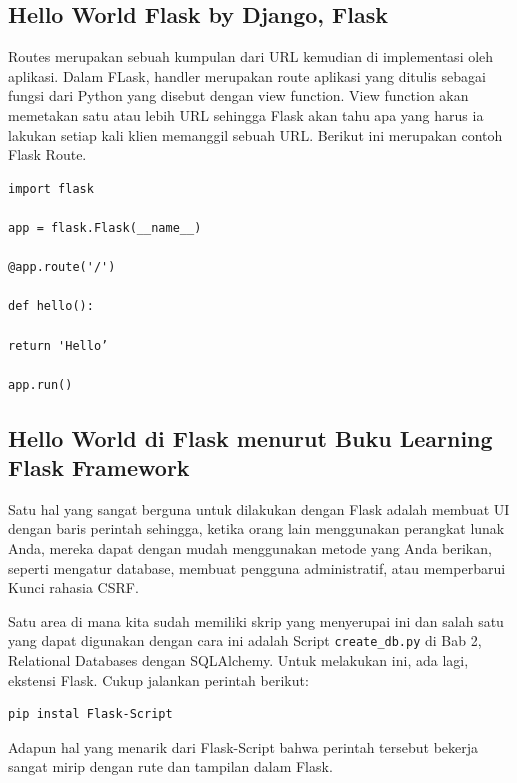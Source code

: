 \subsection{Hello World Flask by Django, Flask}
Routes merupakan sebuah kumpulan dari URL kemudian di implementasi oleh aplikasi. Dalam FLask, handler merupakan route aplikasi yang ditulis sebagai fungsi dari Python yang disebut dengan view function. View function akan memetakan satu atau lebih URL sehingga Flask akan tahu apa yang harus ia lakukan setiap kali klien memanggil sebuah URL. Berikut ini merupakan contoh Flask Route\cite{djangoweb}.
\begin{verbatim}
import flask

app = flask.Flask(__name__)

@app.route('/')

def hello():

return 'Hello’

app.run()

\end{verbatim}

\subsection{Hello World di Flask menurut Buku Learning Flask Framework}
Satu hal yang sangat berguna untuk dilakukan dengan Flask adalah membuat UI dengan baris perintah sehingga, ketika orang lain menggunakan perangkat lunak Anda, mereka dapat dengan mudah menggunakan metode yang Anda berikan, seperti mengatur database, membuat pengguna administratif, atau memperbarui Kunci rahasia CSRF.

Satu area di mana kita sudah memiliki skrip yang menyerupai ini dan salah satu yang dapat digunakan dengan cara ini adalah Script \verb|create_db.py| di Bab 2, Relational Databases dengan SQLAlchemy. Untuk melakukan ini, ada lagi, ekstensi Flask. Cukup jalankan perintah berikut:

\begin{verbatim}
pip instal Flask-Script
\end{verbatim}

Adapun hal yang menarik dari Flask-Script bahwa perintah tersebut bekerja sangat mirip dengan rute dan tampilan dalam Flask.

